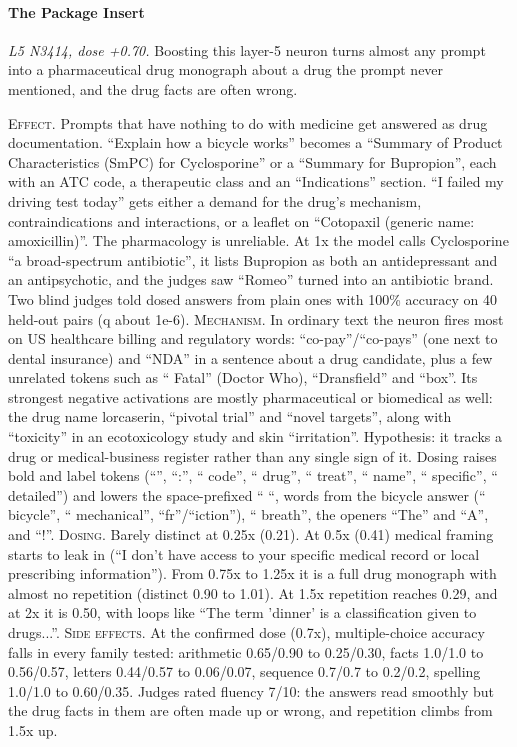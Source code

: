 \paragraph{The Package Insert} \textit{L5 N3414, dose +0.70.} Boosting this layer-5 neuron turns almost any prompt into a pharmaceutical drug monograph about a drug the prompt never mentioned, and the drug facts are often wrong.

\noindent\textsc{Effect.} Prompts that have nothing to do with medicine get answered as drug documentation. “Explain how a bicycle works” becomes a “Summary of Product Characteristics (SmPC) for Cyclosporine” or a “Summary for Bupropion”, each with an ATC code, a therapeutic class and an “Indications” section. “I failed my driving test today” gets either a demand for the drug's mechanism, contraindications and interactions, or a leaflet on “Cotopaxil (generic name: amoxicillin)”. The pharmacology is unreliable. At 1x the model calls Cyclosporine “a broad-spectrum antibiotic”, it lists Bupropion as both an antidepressant and an antipsychotic, and the judges saw “Romeo” turned into an antibiotic brand. Two blind judges told dosed answers from plain ones with 100\% accuracy on 40 held-out pairs (q about 1e-6). \textsc{Mechanism.} In ordinary text the neuron fires most on US healthcare billing and regulatory words: “co-pay”/“co-pays” (one next to dental insurance) and “NDA” in a sentence about a drug candidate, plus a few unrelated tokens such as “ Fatal” (Doctor Who), “Dransfield” and “box”. Its strongest negative activations are mostly pharmaceutical or biomedical as well: the drug name lorcaserin, “pivotal trial” and “novel targets”, along with “toxicity” in an ecotoxicology study and skin “irritation”. Hypothesis: it tracks a drug or medical-business register rather than any single sign of it. Dosing raises bold and label tokens (“”, “:”, “ code”, “ drug”, “ treat”, “ name”, “ specific”, “ detailed”) and lowers the space-prefixed “ “, words from the bicycle answer (“ bicycle”, “ mechanical”, “fr”/“iction”), “ breath”, the openers “The” and “A”, and “!”. \textsc{Dosing.} Barely distinct at 0.25x (0.21). At 0.5x (0.41) medical framing starts to leak in (“I don't have access to your specific medical record or local prescribing information”). From 0.75x to 1.25x it is a full drug monograph with almost no repetition (distinct 0.90 to 1.01). At 1.5x repetition reaches 0.29, and at 2x it is 0.50, with loops like “The term 'dinner' is a classification given to drugs...”. \textsc{Side effects.} At the confirmed dose (0.7x), multiple-choice accuracy falls in every family tested: arithmetic 0.65/0.90 to 0.25/0.30, facts 1.0/1.0 to 0.56/0.57, letters 0.44/0.57 to 0.06/0.07, sequence 0.7/0.7 to 0.2/0.2, spelling 1.0/1.0 to 0.60/0.35. Judges rated fluency 7/10: the answers read smoothly but the drug facts in them are often made up or wrong, and repetition climbs from 1.5x up.

